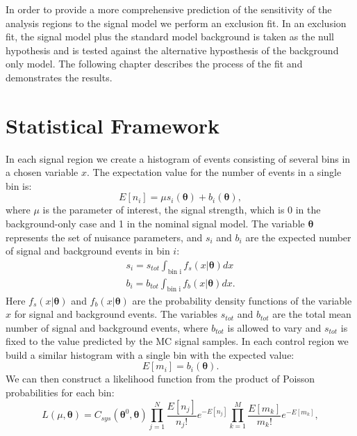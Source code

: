 In order to provide a more comprehensive prediction of the sensitivity of the analysis regions to the signal model we perform an exclusion fit. In an exclusion fit, the signal model plus the standard model background is taken as the null hypothesis and is tested against the alternative hyposthesis of the background only model. The following chapter describes the process of the fit and demonstrates the results.

\section{Statistical Framework}
\label{section:stats}
In each signal region we create a histogram of events consisting of several bins in a chosen variable $x$. The expectation value for the number of events in a single bin is:
\begin{equation}
E[n_i] = \mu s_i(\boldsymbol{\theta}) + b_i(\boldsymbol{\theta}),
\end{equation}
where $\mu$ is the parameter of interest, the signal strength, which is 0 in the background-only case and 1 in the nominal signal model. The variable $\boldsymbol{\theta}$ represents the set of nuisance parameters, and $s_i$ and $b_i$ are the expected number of signal and background events in bin $i$:
\begin{equation}
\begin{gathered}
s_i = s_{tot} \int_{\text{bin i}} f_s(x|\boldsymbol{\theta}) dx \\
b_i = b_{tot} \int_{\text{bin i}} f_b(x|\boldsymbol{\theta}) dx.
\end{gathered}
\end{equation}
Here $f_s(x|\boldsymbol{\theta})$ and $f_b(x|\boldsymbol{\theta})$ are the probability density functions of the variable $x$ for signal and background events. The variables $s_{tot}$ and $b_{tot}$ are the total mean number of signal and background events, where $b_{tot}$ is allowed to vary and $s_{tot}$ is fixed to the value predicted by the MC signal samples.
In each control region we build a similar histogram with a single bin with the expected value:
\begin{equation}
E[m_i] = b_i(\boldsymbol{\theta}).
\end{equation}
We can then construct a likelihood function from the product of Poisson probabilities for each bin:
\begin{equation}
L(\mu,\boldsymbol{\theta}) = C_{sys}(\boldsymbol{\theta}^0,\boldsymbol{\theta})\prod_{j=1}^{N} \frac{E[n_j]}{n_j!}e^{-E[n_j]} \prod_{k=1}^{M} \frac{E[m_k]}{m_k!}e^{-E[m_k]},
\end{equation}
